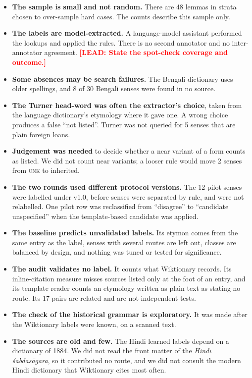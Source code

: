 \documentclass[11pt]{article}
\newcommand{\lead}[1]{\textcolor{red}{\textbf{[LEAD: #1]}}}
\newcommand{\lbl}[1]{\textsc{#1}}
\begin{document}
\begin{itemize}
\item \textbf{The sample is small and not random.} There are 48 lemmas in strata chosen to over-sample hard cases. The counts describe this sample only.
\item \textbf{The labels are model-extracted.} A language-model assistant performed the lookups and applied the rules. There is no second annotator and no inter-annotator agreement. \lead{State the spot-check coverage and outcome.}
\item \textbf{Some absences may be search failures.} The Bengali dictionary uses older spellings, and 8 of 30 Bengali senses were found in no source.
\item \textbf{The Turner head-word was often the extractor's choice}, taken from the language dictionary's etymology where it gave one. A wrong choice produces a false ``not listed''. Turner was not queried for 5 senses that are plain foreign loans.
\item \textbf{Judgement was needed} to decide whether a near variant of a form counts as listed. We did not count near variants; a looser rule would move 2 senses from \lbl{unk} to inherited.
\item \textbf{The two rounds used different protocol versions.} The 12 pilot senses were labelled under v1.0, before senses were separated by rule, and were not relabelled. One pilot row was reclassified from ``disagree'' to ``candidate unspecified'' when the template-based candidate was applied.
\item \textbf{The baseline predicts unvalidated labels.} Its etymon comes from the same entry as the label, senses with several routes are left out, classes are balanced by design, and nothing was tuned or tested for significance.
\item \textbf{The audit validates no label.} It counts what Wiktionary records. Its inline-citation measure misses sources listed only at the foot of an entry, and its template reader counts an etymology written as plain text as stating no route. Its 17 pairs are related and are not independent tests.
\item \textbf{The check of the historical grammar is exploratory.} It was made after the Wiktionary labels were known, on a scanned text.
\item \textbf{The sources are old and few.} The Hindi learned labels depend on a dictionary of 1884. We did not read the front matter of the \textit{Hind\=\i{} \'sabdas\=agara}, so it contributed no route, and we did not consult the modern Hindi dictionary that Wiktionary cites most often.
\end{itemize}
\end{document}
